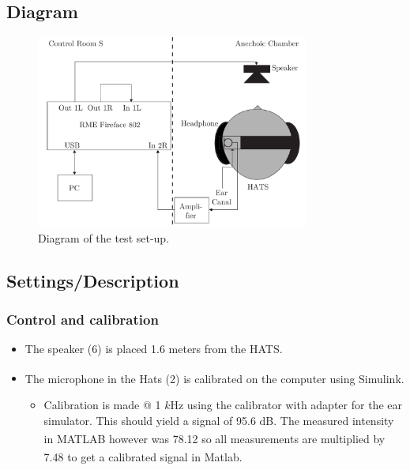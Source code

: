 \subsection{Diagram}
\begin{figure}[H]
	\centering
	\includegraphics[width=0.8\textwidth]{../Journal/Experiments/TestofConsumerHeadphones/OtherBrandsDiagram.pdf}
	\caption{Diagram of the test set-up.}
	\label{OtherBrandsDiagram}
\end{figure}


\subsection{Settings/Description}
\subsubsection{Control and calibration}
\begin{itemize}
	\item The speaker (6) is placed 1.6 meters from the HATS.
	\item The microphone in the Hats (2) is calibrated on the computer using Simulink\textsuperscript{\textregistered}.
	\begin{itemize} 
		\item Calibration is made @ 1 $k$Hz using the calibrator with adapter for the ear simulator. This should yield a signal of 95.6 dB. The measured intensity in MATLAB\textsuperscript{\textregistered} however was 78.12 so all measurements are multiplied by 7.48 to get a calibrated signal in Matlab\textsuperscript{\textregistered}.
	\end{itemize}
\end{itemize}

